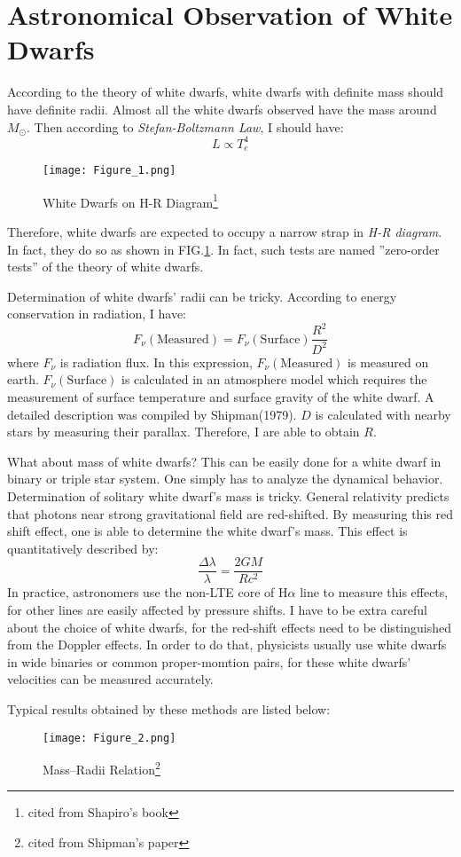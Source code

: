 \documentclass[reprint]{revtex4-1}
\begin{document}
\section{Astronomical Observation of White Dwarfs}
 According to the theory of white dwarfs, white dwarfs with definite mass should have definite radii. Almost all the white dwarfs observed have the mass around $M_{\odot}$. Then according to \emph{Stefan-Boltzmann Law}, I should have:
 \begin{equation}
 L\propto T_e^4
 \end{equation} 
 \begin{figure}
 	\centering   
 	\texttt{[image: Figure\_1.png]}  
 	\caption{White Dwarfs on H-R Diagram\footnote{cited from Shapiro's book}} 
 	\label{fig:1} 
 \end{figure}
 Therefore, white dwarfs are expected to occupy a narrow strap in \emph{H-R diagram}. In fact, they do so as shown in FIG.\ref{fig:1}. In fact, such tests are named ''zero-order tests'' of the theory of white dwarfs.\par
 Determination of white dwarfs' radii can be tricky. According to energy conservation in radiation, I have:
 \begin{equation}
 F_{\nu}(\text{Measured})=F_{\nu}(\text{Surface})\frac{R^{2}}{D^{2}}
 \end{equation}
 where $F_{\nu}$ is radiation flux. In this expression, $F_{\nu}(\text{Measured})$ is measured on earth. $F_{\nu}(\text{Surface})$ is calculated in an atmosphere model which requires the measurement of surface temperature and surface gravity of the white dwarf. A detailed description was compiled by Shipman(1979). $D$ is calculated with nearby stars by measuring their parallax. Therefore, I are able to obtain $R$.\par
 What about mass of white dwarfs? This can be easily done for a white dwarf in binary or triple star system. One simply has to analyze the dynamical behavior. Determination of solitary white dwarf's mass is tricky. General relativity predicts that photons near strong gravitational field are red-shifted. By measuring this red shift effect, one is able to determine the white dwarf's mass. This effect is quantitatively described by:
 \begin{equation}
 \frac{\Delta \lambda}{\lambda}=\frac{2GM}{Rc^2}
 \end{equation}
 In practice, astronomers use the non-LTE core of H$\alpha$ line to measure this effects, for other lines are easily affected by pressure shifts. I have to be extra careful about the choice of white dwarfs, for the red-shift effects need to be distinguished from the Doppler effects. In order to do that, physicists usually use white dwarfs in wide binaries or common proper-momtion pairs, for these white dwarfs' velocities can be measured accurately.\par
 Typical results obtained by these methods are listed below:
  \begin{figure}
  	\centering   
  	\texttt{[image: Figure\_2.png]}  
  	\caption{Mass--Radii Relation\footnote{cited from Shipman's paper}} 
  	\label{fig:2} 
  \end{figure}
  
\end{document}

